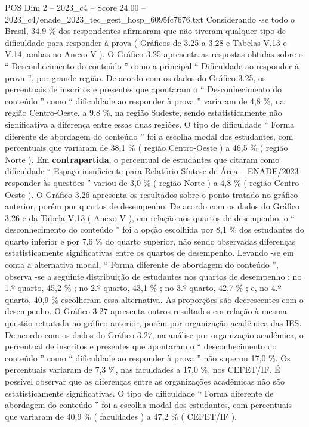 \begin{textsample}{POS Dim 2 – 2023\_c4 – Score 24.00 – 2023\_c4/enade\_2023\_tec\_gest\_hosp\_6095fc7676.txt}
Considerando -se todo o Brasil, 34,9 \% dos respondentes afirmaram que não tiveram qualquer tipo de dificuldade para responder à prova ( Gráficos de 3.25 a 3.28 e Tabelas V.13 e V.14, ambas no Anexo V ).
O Gráfico 3.25 apresenta as respostas obtidas sobre o “ Desconhecimento do conteúdo ” como a principal “ Dificuldade ao responder à prova ”, por grande região.
De acordo com os dados do Gráfico 3.25, os percentuais de inscritos e presentes que apontaram o “ Desconhecimento do conteúdo ” como “ dificuldade ao responder à prova ” variaram de 4,8 \%, na região Centro-Oeste, a 9,8 \%, na região Sudeste, sendo estatisticamente não significativa a diferença entre essas duas regiões.
O tipo de dificuldade “ Forma diferente de abordagem do conteúdo ” foi a escolha modal dos estudantes, com percentuais que variaram de 38,1 \% ( região Centro-Oeste ) a 46,5 \% ( região Norte ).
Em \textbf{contrapartida}, o percentual de estudantes que citaram como dificuldade “ Espaço insuficiente para Relatório Síntese de Área – ENADE/2023 responder às questões ” variou de 3,0 \% ( região Norte ) a 4,8 \% ( região Centro-Oeste ).
O Gráfico 3.26 apresenta os resultados sobre o ponto tratado no gráfico anterior, porém por quartos de desempenho.
De acordo com os dados do Gráfico 3.26 e da Tabela V.13 ( Anexo V ), em relação aos quartos de desempenho, o “ desconhecimento do conteúdo ” foi a opção escolhida por 8,1 \% dos estudantes do quarto inferior e por 7,6 \% do quarto superior, não sendo observadas diferenças estatisticamente significativas entre os quartos de desempenho.
Levando -se em conta a alternativa modal, “ Forma diferente de abordagem do conteúdo ”, observa -se a seguinte distribuição de estudantes nos quartos de desempenho : no 1.º quarto, 45,2 \% ; no 2.º quarto, 43,1 \% ; no 3.º quarto, 42,7 \% ; e, no 4.º quarto, 40,9 \% escolheram essa alternativa.
As proporções são decrescentes com o desempenho.
O Gráfico 3.27 apresenta outros resultados em relação à mesma questão retratada no gráfico anterior, porém por organização acadêmica das IES.
De acordo com os dados do Gráfico 3.27, na análise por organização acadêmica, o percentual de inscritos e presentes que apontaram o “ desconhecimento do conteúdo ” como “ dificuldade ao responder à prova ” não superou 17,0 \%.
Os percentuais variaram de 7,3 \%, nas faculdades a 17,0 \%, nos CEFET/IF.
É possível observar que as diferenças entre as organizações acadêmicas não são estatisticamente significativas.
O tipo de dificuldade “ Forma diferente de abordagem do conteúdo ” foi a escolha modal dos estudantes, com percentuais que variaram de 40,9 \% ( faculdades ) a 47,2 \% ( CEFET/IF ).

\end{textsample}

